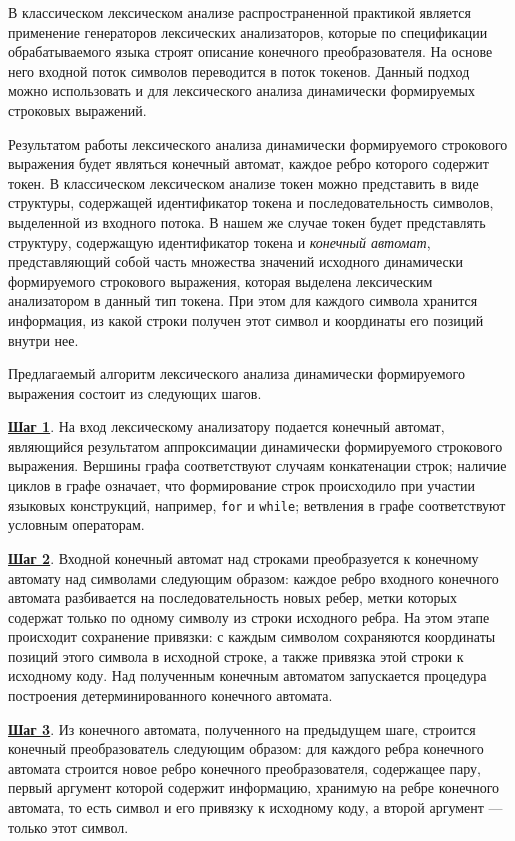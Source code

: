 В классическом лексическом анализе распространенной практикой является применение генераторов лексических анализаторов, которые по спецификации обрабатываемого языка строят описание конечного преобразователя. На основе него входной поток символов переводится в поток токенов. Данный подход можно использовать и для лексического анализа динамически формируемых строковых выражений. 

Результатом работы лексического анализа динамически формируемого строкового выражения будет являться конечный автомат, каждое ребро которого содержит токен. В классическом лексическом анализе токен можно представить в виде структуры, содержащей идентификатор токена и последовательность символов, выделенной из входного потока. В нашем же случае токен будет представлять структуру, содержащую идентификатор токена  и \textit{конечный автомат}, представляющий собой часть множества значений исходного динамически формируемого строкового выражения, которая выделена лексическим анализатором в данный тип токена. При этом для каждого символа хранится информация, из какой строки получен этот символ и координаты его позиций внутри нее. 

Предлагаемый алгоритм лексического анализа динамически формируемого выражения состоит из следующих шагов.

\textbf{\underline{Шаг 1}}. На вход лексическому анализатору подается конечный автомат, являющийся результатом аппроксимации динамически формируемого строкового выражения. Вершины графа соответствуют случаям конкатенации строк; наличие циклов в графе означает, что формирование строк происходило при участии языковых конструкций, например, \verb|for| и \verb|while|; ветвления в графе соответствуют условным операторам.  

\textbf{\underline{Шаг 2}}. Входной конечный автомат над строками преобразуется к конечному автомату над символами следующим образом: каждое ребро входного конечного автомата разбивается на последовательность новых ребер, метки которых содержат только по одному символу из строки исходного ребра. На этом этапе происходит сохранение привязки: с каждым символом сохраняются координаты позиций этого символа в исходной строке, а также привязка этой строки к исходному коду. Над полученным конечным автоматом запускается процедура построения детерминированного конечного автомата. 

\textbf{\underline{Шаг 3}}. Из конечного автомата, полученного на предыдущем шаге, строится конечный преобразователь следующим образом: для каждого ребра конечного автомата строится новое ребро конечного преобразователя, содержащее пару, первый аргумент которой содержит информацию, хранимую на ребре конечного автомата, то есть символ и его привязку к исходному коду, а второй аргумент {---} только этот символ.

